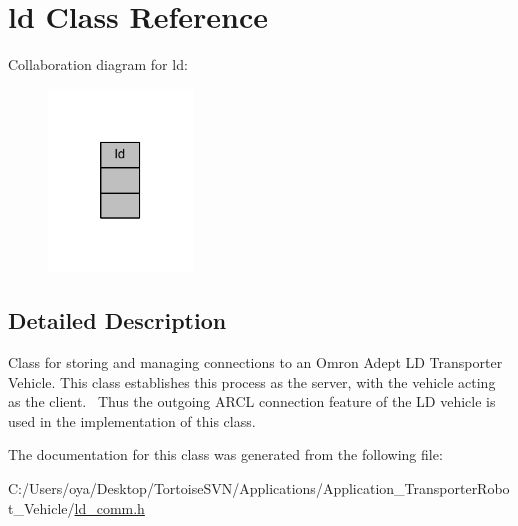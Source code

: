 \hypertarget{classld}{}\section{ld Class Reference}
\label{classld}


Collaboration diagram for ld\+:\nopagebreak
\begin{figure}[H]
\begin{center}
\leavevmode
\includegraphics[width=109pt]{classld__coll__graph}
\end{center}
\end{figure}


\subsection{Detailed Description}
Class for storing and managing connections to an Omron Adept LD Transporter Vehicle. This class establishes this process as the server, with the vehicle acting as the client.~\newline
 Thus the outgoing A\+R\+CL connection feature of the LD vehicle is used in the implementation of this class. 

The documentation for this class was generated from the following file\+:\begin{DoxyCompactItemize}
\item 
C\+:/\+Users/oya/\+Desktop/\+Tortoise\+S\+V\+N/\+Applications/\+Application\+\_\+\+Transporter\+Robot\+\_\+\+Vehicle/\mbox{\hyperlink{ld__comm_8h}{ld\+\_\+comm.\+h}}\end{DoxyCompactItemize}
